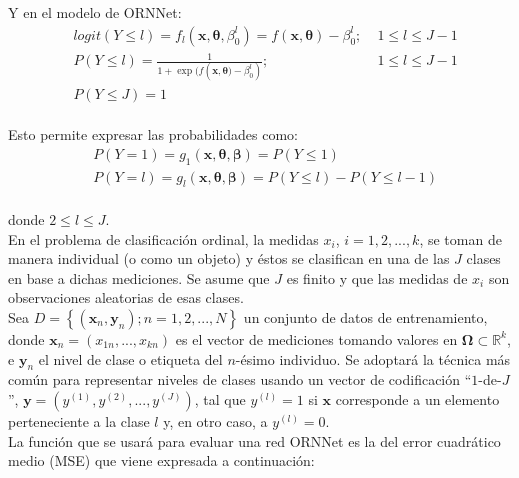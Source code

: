 		Y en el modelo de ORNNet:\\
		
		\begin{eqnarray}
			& logit(Y\le l)=f_l(\mathbf{x},{\boldsymbol \theta},\beta^l_0)=f(\mathbf{x},{\boldsymbol \theta})-\beta^l_0;\; & 1\le l\le J-1\\
			& P(Y\le l)=\frac{1}{1+\exp(f(\mathbf{x},{\boldsymbol \theta)}-\beta^l_0)};\; & 1\le l\le J-1\\
			& P(Y\le J)=1 & 
			\label{ORNNet_odds}
		\end{eqnarray}\\

		Esto permite expresar las probabilidades como:\\
		
		\begin{eqnarray}
			& P(Y=1)=g_{1}(\mathbf{x},\boldsymbol{\theta},{\boldsymbol \beta})=P(Y\le 1) \\
			& P(Y=l)=g_{l}(\mathbf{x},\boldsymbol{\theta},{\boldsymbol \beta})=P(Y\le l)-P(Y\le l-1)
			\label{probability}
		\end{eqnarray}\\
		
		donde $2 \leq l \leq J$.\\
		
		En el problema de clasificación ordinal, la medidas $x_{i}$, $i=1,2,...,k$, se toman de manera individual (o como un objeto) y éstos se clasifican en una de las $J$ clases en base a dichas mediciones. Se asume que $J$ es finito y que las medidas de $x_{i}$ son observaciones aleatorias de esas clases.\\
		
		Sea $D = \left\{(\mathbf{x}_{n}, \mathbf{y}_{n}); n=1,2,...,N\right\}$ un conjunto de datos de entrenamiento, donde $\mathbf{x}_{n} =(x_{1n},...,x_{kn})$ es el vector de mediciones tomando valores en $\mathbf{\Omega} \subset {\mathbb R}^{k}$, e $\mathbf{y}_{n}$ el nivel de clase o etiqueta del $n$-ésimo individuo. Se adoptará la técnica más común para representar niveles de clases usando un vector de codificación ``$1$-de-$J$'', $\mathbf{y}=\left(y^{(1)} ,y^{(2)} ,...,y^{(J)} \right)$, tal que $y^{(l)} =1$ si $\mathbf{x}$ corresponde a un elemento perteneciente a la clase $l$ y, en otro caso, a $y^{(l)} =0$.\\
		
		La función que se usará para evaluar una red ORNNet es la del error cuadrático medio (MSE) que viene expresada a continuación:\\
		
